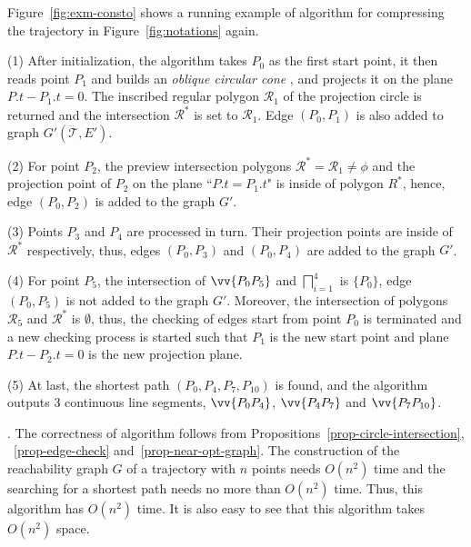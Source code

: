 \begin{example}
\label{exm-alg-conesto}
Figure~\ref{fig:exm-consto}  shows a running example of algorithm \cisto for compressing the trajectory  in Figure~\ref{fig:notations} again.


\sstab (1) After initialization, the \cisto algorithm takes $P_0$ as the first start point, it then reads point $P_1$ and builds an \emph{oblique circular cone} ,  and projects it on the plane $P.t-P_1.t=0$. The inscribed
regular polygon $\mathcal{R}_1$ of the projection circle is returned and the intersection $\mathcal{R}^*$ is set to $\mathcal{R}_1$.
Edge $(P_0,P_{1})$ is also added to graph $G'(\dddot{\mathcal{T}},E')$. 

\sstab (2) For point $P_2$, the preview intersection
polygons $\mathcal{R}^*=\mathcal{R}_1 \ne \phi$ and the projection point of $P_2$ on the plane ``$P.t = P_1.t$" is inside of polygon $R^*$, hence, edge $(P_0,P_{2})$ is added to the graph $G'$. 

\sstab (3) Points $P_3$ and $P_4$ are processed in turn. Their projection points are inside of $\mathcal{R}^*$ respectively, thus, edges $(P_0,P_{3})$ and $(P_0,P_{4})$ are added to the graph $G'$. 


\sstab (4) For point $P_5$, the intersection of $\vv{P_0P_{5}}$ and $\bigsqcap_{i=1}^{
  4}$ is $\{P_0\}$, edge
$(P_0,P_{5})$ is not added to the graph $G'$. 
Moreover, the intersection of polygons $\mathcal{R}_5$ and $\mathcal{R}^*$ is $\emptyset$, 
thus, the checking of edges start from point $P_0$ is terminated and a new checking process is started such that $P_1$ is the new start point and plane $P.t-P_2.t=0$ is the new projection plane.

\sstab (5) At last, the shortest path $(P_0, P_4, P_7, P_{10})$ is found, and the algorithm outputs 3 continuous line segments, \ie $\vv{P_0P_4}$, $\vv{P_4P_7}$ and $\vv{P_7P_{10}}$.
\end{example}



.
The correctness of algorithm \cisto follows from Propositions~\ref{prop-circle-intersection}, ~\ref{prop-edge-check} and~\ref{prop-near-opt-graph}.
%
The construction of the reachability graph $G$ of a trajectory with $n$ points needs $O(n^2)$ time and the searching for a shortest path needs no more than $O(n^2)$ time. Thus, this algorithm has $O(n^2)$ time. 
It is also easy to see that this algorithm takes $O(n^2)$ space.
